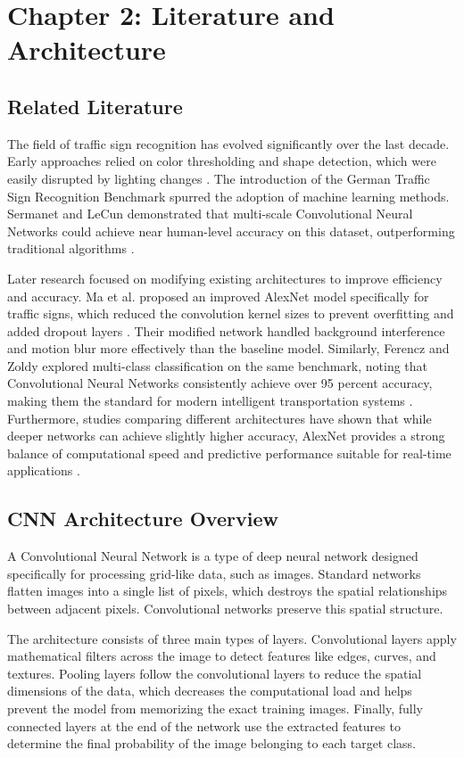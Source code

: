 \documentclass[conference]{IEEEtran}
\begin{document}
\section{Chapter 2: Literature and Architecture}

\subsection{Related Literature}
The field of traffic sign recognition has evolved significantly over the last decade. Early approaches relied on color thresholding and shape detection, which were easily disrupted by lighting changes \cite{stallkamp2012man}. The introduction of the German Traffic Sign Recognition Benchmark spurred the adoption of machine learning methods. Sermanet and LeCun demonstrated that multi-scale Convolutional Neural Networks could achieve near human-level accuracy on this dataset, outperforming traditional algorithms \cite{sermanet2011traffic}. 

Later research focused on modifying existing architectures to improve efficiency and accuracy. Ma et al. proposed an improved AlexNet model specifically for traffic signs, which reduced the convolution kernel sizes to prevent overfitting and added dropout layers \cite{ma2018traffic}. Their modified network handled background interference and motion blur more effectively than the baseline model. Similarly, Ferencz and Zoldy explored multi-class classification on the same benchmark, noting that Convolutional Neural Networks consistently achieve over 95 percent accuracy, making them the standard for modern intelligent transportation systems \cite{ferencz2023neural}. Furthermore, studies comparing different architectures have shown that while deeper networks can achieve slightly higher accuracy, AlexNet provides a strong balance of computational speed and predictive performance suitable for real-time applications \cite{arcos2025advancing}.

\subsection{CNN Architecture Overview}
A Convolutional Neural Network is a type of deep neural network designed specifically for processing grid-like data, such as images. Standard networks flatten images into a single list of pixels, which destroys the spatial relationships between adjacent pixels. Convolutional networks preserve this spatial structure. 

The architecture consists of three main types of layers. Convolutional layers apply mathematical filters across the image to detect features like edges, curves, and textures. Pooling layers follow the convolutional layers to reduce the spatial dimensions of the data, which decreases the computational load and helps prevent the model from memorizing the exact training images. Finally, fully connected layers at the end of the network use the extracted features to determine the final probability of the image belonging to each target class. 
\end{document}
